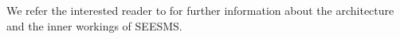 \documentclass[authoryear]{elsarticle}
\begin{document}
We refer the interested reader to  \cite{DeSantis2010} for further information about the architecture and the inner workings of SEESMS.




%
%
%
%
%
%
%
%
%
%
\end{document}
